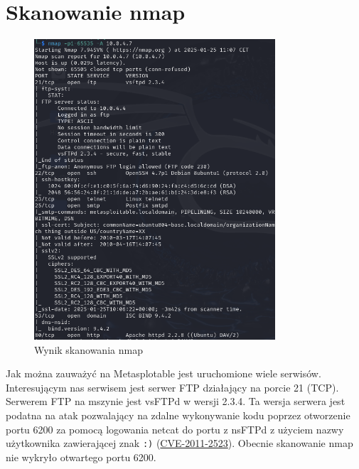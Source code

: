 \documentclass{article}
\begin{document}
\section*{Skanowanie nmap}
\begin{figure}[H]
    \centering
    \includegraphics[width=0.8\textwidth]{skanowanie_tcp.png}
    \caption{Wynik skanowania nmap}
\end{figure}
Jak można zauważyć na Metasplotable jest uruchomione wiele serwisów. Interesującym nas serwisem jest serwer FTP działający na porcie 21 (TCP).
Serwerem FTP na mszynie jest vsFTPd w wersji 2.3.4. Ta wersja serwera jest podatna na atak pozwalający na zdalne wykonywanie kodu poprzez otworzenie portu 6200 za pomocą logowania netcat do portu z nsFTPd z użyciem nazwy użytkownika zawierającej znak \texttt{:)} (\href{https://nvd.nist.gov/vuln/detail/CVE-2011-2523}{CVE-2011-2523}).
Obecnie skanowanie nmap nie wykryło otwartego portu 6200.
\end{document}
